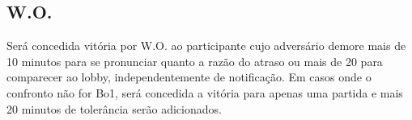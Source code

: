 \subsection{W.O.}

Será concedida vitória por W.O. ao participante cujo adversário demore mais de 10 minutos para se pronunciar quanto a razão do atraso ou mais de 20 para comparecer ao lobby, independentemente de notificação. Em casos onde o confronto não for Bo1, será concedida a vitória para apenas uma partida e mais 20 minutos de tolerância serão adicionados.
